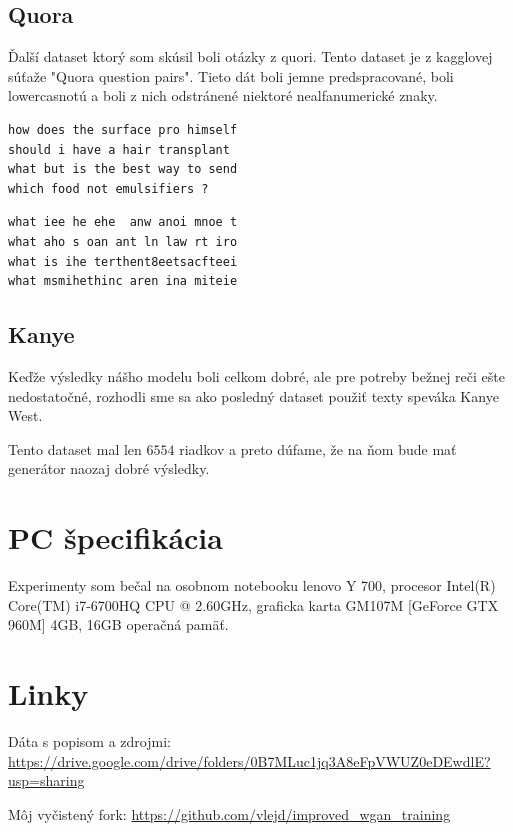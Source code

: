 \documentclass[10pt,a4paper]{article}
\begin{document}
\subsection{Quora}
Ďalší dataset ktorý som skúsil boli otázky z quori. 
Tento dataset je z kagglovej súťaže "Quora question pairs".
Tieto dát boli jemne predspracované, boli lowercasnotú a boli z nich odstránené niektoré nealfanumerické znaky. 

\begin{verbatim}
how does the surface pro himself
should i have a hair transplant 
what but is the best way to send
which food not emulsifiers ?
\end{verbatim}

\begin{verbatim}
what iee he ehe  anw anoi mnoe t
what aho s oan ant ln law rt iro
what is ihe terthent8eetsacfteei
what msmihethinc aren ina miteie
\end{verbatim}


\subsection{Kanye}
Keďže výsledky nášho modelu boli celkom dobré, ale pre potreby bežnej reči ešte nedostatočné, rozhodli sme sa ako posledný dataset použiť texty speváka Kanye West.

Tento dataset mal len $6554$ riadkov a preto dúfame, že na ňom bude mať generátor naozaj dobré výsledky.




\section{PC špecifikácia}
Experimenty som bečal na osobnom notebooku lenovo Y 700, procesor Intel(R) Core(TM) i7-6700HQ CPU @ 2.60GHz, graficka karta GM107M [GeForce GTX 960M] 4GB, 16GB operačná pamäť.

\section{Linky}
Dáta s popisom a zdrojmi: \href{https://drive.google.com/drive/folders/0B7MLuc1jq3A8eFpVWUZ0eDEwdlE?usp=sharing}{https://drive.google.com/drive/folders/0B7MLuc1jq3A8eFpVWUZ0eDEwdlE?usp=sharing}

Môj vyčistený fork: \href{https://github.com/vlejd/improved\_wgan\_training}{https://github.com/vlejd/improved\_wgan\_training}
\end{document}
